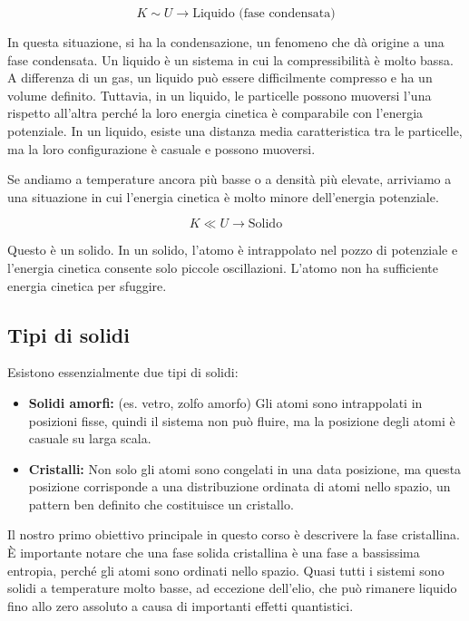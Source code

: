 \begin{equation}
 K \sim U \rightarrow \text{Liquido (fase condensata)}
\end{equation}

In questa situazione, si ha la condensazione, un fenomeno che dà origine a una fase condensata. Un liquido è un sistema in cui la compressibilità è molto bassa. A differenza di un gas, un liquido può essere difficilmente compresso e ha un volume definito. Tuttavia, in un liquido, le particelle possono muoversi l'una rispetto all'altra perché la loro energia cinetica è comparabile con l'energia potenziale. In un liquido, esiste una distanza media caratteristica tra le particelle, ma la loro configurazione è casuale e possono muoversi.

Se andiamo a temperature ancora più basse o a densità più elevate, arriviamo a una situazione in cui l'energia cinetica è molto minore dell'energia potenziale.

\begin{equation}
 K \ll U \rightarrow \text{Solido}
\end{equation}

Questo è un solido. In un solido, l'atomo è intrappolato nel pozzo di potenziale e l'energia cinetica consente solo piccole oscillazioni. L'atomo non ha sufficiente energia cinetica per sfuggire.

\subsection*{Tipi di solidi}

Esistono essenzialmente due tipi di solidi:
\begin{itemize}
    \item \textbf{Solidi amorfi:} (es. vetro, zolfo amorfo) Gli atomi sono intrappolati in posizioni fisse, quindi il sistema non può fluire, ma la posizione degli atomi è casuale su larga scala.
    \item \textbf{Cristalli:} Non solo gli atomi sono congelati in una data posizione, ma questa posizione corrisponde a una distribuzione ordinata di atomi nello spazio, un pattern ben definito che costituisce un cristallo.
\end{itemize}

Il nostro primo obiettivo principale in questo corso è descrivere la fase cristallina. È importante notare che una fase solida cristallina è una fase a bassissima entropia, perché gli atomi sono ordinati nello spazio. Quasi tutti i sistemi sono solidi a temperature molto basse, ad eccezione dell'elio, che può rimanere liquido fino allo zero assoluto a causa di importanti effetti quantistici.

